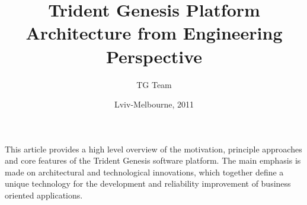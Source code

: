 \begin{titlepage}
\title{Trident Genesis Platform Architecture from Engineering Perspective}
\author{TG Team}
\date{Lviv-Melbourne, 2011}
\maketitle
\clearpage
  This article provides a high level overview of the motivation, principle approaches and core features of the Trident Genesis software platform.
  The main emphasis is made on architectural and technological innovations, which together define a unique technology for the development and reliability improvement of business oriented applications.

\clearpage
\tableofcontents
\clearpage

\end{titlepage}